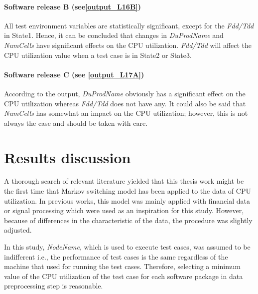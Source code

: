 \paragraph{Software release B (see\ref{output_L16B})}

All test environment variables are statistically significant, except
for the \emph{Fdd/Tdd} in State1. Hence, it can be concluded that
changes in \emph{DuProdName} and \emph{NumCells} have significant
effects on the CPU utilization. \emph{Fdd/Tdd} will affect the CPU
utilization value when a test case is in State2 or State3. 

\paragraph{Software release C (see \ref{output_L17A})}

According to the output, \emph{DuProdName} obviously has a significant
effect on the CPU utilization whereas\emph{ Fdd/Tdd} does not have
any. It could also be said that \emph{NumCells} has somewhat an impact
on the CPU utilization; however, this is not always the case and should
be taken with care.

\section{Results discussion\label{sec:Results-discussion}}

A thorough search of relevant literature yielded that this thesis
work might be the first time that Markov switching model has been
applied to the data of CPU utilization. In previous works, this model
was mainly applied with financial data or signal processing which
were used as an inspiration for this study. However, because of differences
in the characteristic of the data, the procedure was slightly adjusted.
\begin{comment}
A large amount of time was spent on understanding the data, examining
which variables had a significant impact on the CPU utilization, and
determining which methods would provide the best possible outcome
for this problem. Besides, after deciding on the most promising method,
a lot of effort was invested studying implemented algorithms in the
R package as well as modifying code as necessary. 
\end{comment}

In this study, \emph{NodeName}, which is used to execute test cases,
was assumed to be indifferent i.e., the performance of test cases
is the same regardless of the machine that used for running the test
cases. Therefore, selecting a minimum value of the CPU utilization
of the test case for each software package in data preprocessing step
is reasonable. 

